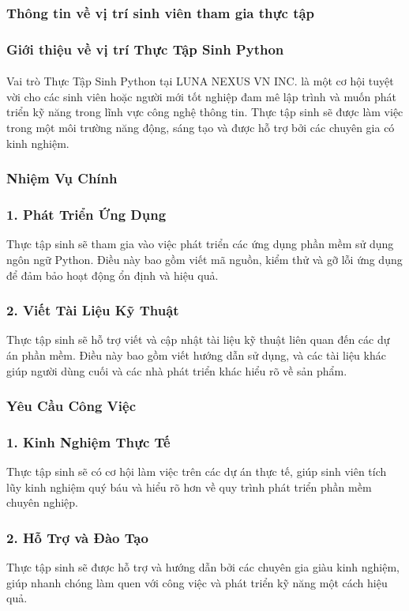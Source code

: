 \begin{flushleft}
		\subsubsection{Thông tin về vị trí sinh viên tham gia thực tập}
		\subsubsection*{Giới thiệu về vị trí Thực Tập Sinh Python}
		\paragraph{}
		Vai trò Thực Tập Sinh Python tại LUNA NEXUS VN INC. là một cơ hội tuyệt vời cho các sinh viên hoặc người mới tốt nghiệp đam mê lập trình và muốn phát triển kỹ năng trong lĩnh vực công nghệ thông tin. Thực tập sinh sẽ được làm việc trong một môi trường năng động, sáng tạo và được hỗ trợ bởi các chuyên gia có kinh nghiệm.
		\subsubsection*{Nhiệm Vụ Chính}
		\subsubsection*{1. Phát Triển Ứng Dụng}
		Thực tập sinh sẽ tham gia vào việc phát triển các ứng dụng phần mềm sử dụng ngôn ngữ Python. Điều này bao gồm viết mã nguồn, kiểm thử và gỡ lỗi ứng dụng để đảm bảo hoạt động ổn định và hiệu quả.
		\subsubsection*{2. Viết Tài Liệu Kỹ Thuật}
		Thực tập sinh sẽ hỗ trợ viết và cập nhật tài liệu kỹ thuật liên quan đến các dự án phần mềm. Điều này bao gồm viết hướng dẫn sử dụng, và các tài liệu khác giúp người dùng cuối và các nhà phát triển khác hiểu rõ về sản phẩm.
		\pagebreak
		\subsubsection*{Yêu Cầu Công Việc}
		\subsubsection*{1. Kinh Nghiệm Thực Tế}
		Thực tập sinh sẽ có cơ hội làm việc trên các dự án thực tế, giúp sinh viên tích lũy kinh nghiệm quý báu và hiểu rõ hơn về quy trình phát triển phần mềm chuyên nghiệp.

		\subsubsection*{2. Hỗ Trợ và Đào Tạo}
		Thực tập sinh sẽ được hỗ trợ và hướng dẫn bởi các chuyên gia giàu kinh nghiệm, giúp nhanh chóng làm quen với công việc và phát triển kỹ năng một cách hiệu quả.


\end{flushleft}
